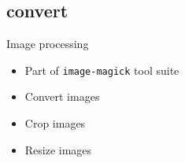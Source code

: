 \subsection{convert}

\begin{frame}[fragile]{Image processing}
  \begin{itemize}
    \pause \item Part of \texttt{image-magick} tool suite
    \pause \item Convert images
    \pause \item Crop images
    \pause \item Resize images
  \end{itemize}
\end{frame}
